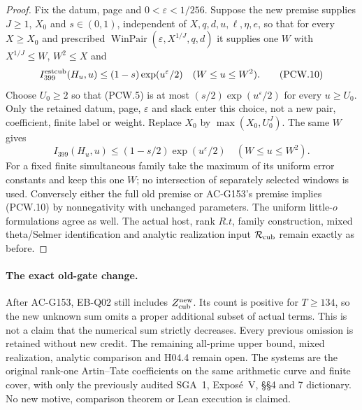 \begin{proof}
Fix the datum, page and $0<\varepsilon<1/256$.
Suppose the new premise supplies $J\geq1$, $X_0$ and
$s\in(0,1)$, independent of $X,q,d,u,\ell,\eta,e$, so that
for every $X\geq X_0$ and prescribed
$\operatorname{WinPair}(\varepsilon,X^{1/J},q,d)$ it supplies
one $W$ with $X^{1/J}\leq W$, $W^2\leq X$ and
\[
 I_{399}^{\rm estcub}(H_u,u)\leq(1-s)\exp(u^\varepsilon/2)
                                 \quad(W\leq u\leq W^2).
 \tag{PCW.10}
\]
Choose $U_0\geq2$ so that (PCW.5) is at most
$(s/2)\exp(u^\varepsilon/2)$ for every $u\geq U_0$.
Only the retained datum, page, $\varepsilon$ and slack enter
this choice, not a new pair, coefficient, finite label or weight.
Replace $X_0$ by $\max(X_0,U_0^J)$.  The same $W$ gives
\[
 I_{399}(H_u,u)\leq(1-s/2)\exp(u^\varepsilon/2)
                                 \quad(W\leq u\leq W^2).
 \tag{PCW.11}
\]
For a fixed finite simultaneous family take the maximum of its
uniform error constants and keep this one $W$; no intersection
of separately selected windows is used.
Conversely either the full old premise or AC-G153's premise
implies (PCW.10) by nonnegativity with unchanged parameters.
The uniform little-$o$ formulations agree as well.
The actual host, rank $R.t$, family construction, mixed
theta/Selmer identification and analytic realization input
$\mathcal R_{\rm cub}$ remain exactly as before.
\end{proof}

\paragraph{The exact old-gate change.}
After AC-G153, EB-Q02 still includes $Z_{\rm cub}^{\rm new}$.
Its count is positive for $T\geq134$, so the new unknown sum
omits a proper additional subset of actual terms.
This is not a claim that the numerical sum strictly decreases.
Every previous omission is retained without new credit.
The remaining all-prime upper bound, mixed realization,
analytic comparison and H04.4 remain open.
The systems are the original rank-one Artin--Tate coefficients
on the same arithmetic curve and finite cover, with only the
previously audited SGA~1, Expos\'e~V, \S\S4 and 7 dictionary.
No new motive, comparison theorem or Lean execution is claimed.

